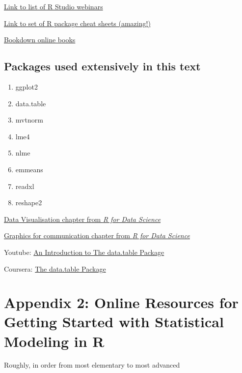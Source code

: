 \documentclass[]{book}
\providecommand{\tightlist}{%
  \setlength{\itemsep}{0pt}\setlength{\parskip}{0pt}}
\begin{document}
\href{https://www.rstudio.com/resources/webinars/}{Link to list of R Studio webinars}

\href{https://www.rstudio.com/resources/cheatsheets/}{Link to set of R package cheat sheets (amazing!)}

\href{https://bookdown.org}{Bookdown online books}

\hypertarget{packages-used-extensively-in-this-text}{%
\section{Packages used extensively in this text}\label{packages-used-extensively-in-this-text}}

\begin{enumerate}
\def\labelenumi{\arabic{enumi}.}
\tightlist
\item
  ggplot2
\item
  data.table
\item
  mvtnorm
\item
  lme4
\item
  nlme
\item
  emmeans
\item
  readxl
\item
  reshape2
\end{enumerate}

\href{http://r4ds.had.co.nz/data-visualisation.html}{Data Visualisation chapter from \emph{R for Data Science}}

\href{http://r4ds.had.co.nz/graphics-for-communication.html}{Graphics for communication chapter from \emph{R for Data Science}}

Youtube: \href{https://www.youtube.com/watch?v=pc1ARG6kbAM}{An Introduction to The data.table Package}

Coursera: \href{https://www.coursera.org/learn/data-cleaning/lecture/trMZ7/the-data-table-package}{The data.table Package}

\hypertarget{appendix-2-online-resources-for-getting-started-with-statistical-modeling-in-r}{%
\chapter*{Appendix 2: Online Resources for Getting Started with Statistical Modeling in R}\label{appendix-2-online-resources-for-getting-started-with-statistical-modeling-in-r}}

Roughly, in order from most elementary to most advanced
\end{document}
